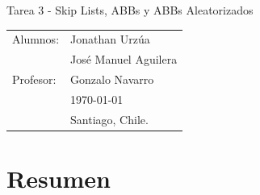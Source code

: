 \documentclass[11pt,letterpaper]{article}
\begin{document}
\newpage
\pagestyle{fancy}
\fancyhf{}
\vspace*{6cm}
\begin{center}
\Huge  {Tarea 3 - Skip Lists, ABBs y ABBs Aleatorizados}\\
\vspace{1cm}
\end{center}
\vfill
\begin{flushright}
\begin{tabular}{ll}
Alumnos: & Jonathan Urzúa\\
		& José Manuel Aguilera\\
Profesor: & Gonzalo Navarro\\
& \today\\
& Santiago, Chile.
\end{tabular}
\end{flushright}

\newpage
\pagestyle{fancy}
\fancyhf{}

\fancyhead[R]{\small \rm \textbf{\thepage}} %



\renewcommand{\sectionmark}[1]{\markright{\thesection.\ #1}}
\renewcommand{\headrulewidth}{0.5pt}
\renewcommand{\footrulewidth}{0.5pt}


\tableofcontents
\listoffigures

\newpage
\section{Resumen}
\end{document}
